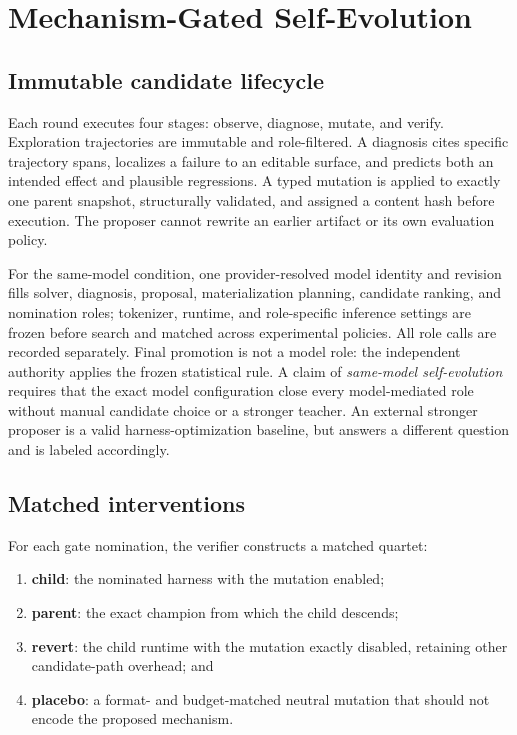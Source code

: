 \section{Mechanism-Gated Self-Evolution}
\label{sec:method}

\subsection{Immutable candidate lifecycle}

Each round executes four stages: observe, diagnose, mutate, and verify.
Exploration trajectories are immutable and role-filtered.  A diagnosis cites
specific trajectory spans, localizes a failure to an editable surface, and
predicts both an intended effect and plausible regressions.  A typed mutation
is applied to exactly one parent snapshot, structurally validated, and assigned
a content hash before execution.  The proposer cannot rewrite an earlier
artifact or its own evaluation policy.

For the same-model condition, one provider-resolved model identity and revision
fills solver, diagnosis, proposal, materialization planning, candidate ranking,
and nomination roles; tokenizer, runtime, and role-specific inference settings
are frozen before search and matched across experimental policies.  All role
calls are recorded separately.  Final promotion is not a model role: the
independent authority applies the frozen statistical rule.  A claim of
\emph{same-model self-evolution} requires that the exact model configuration
close every model-mediated role without manual candidate choice or a stronger
teacher.  An external stronger proposer is a valid harness-optimization
baseline, but answers a different question and is labeled accordingly.

\subsection{Matched interventions}

For each gate nomination, the verifier constructs a matched quartet:
\begin{enumerate}
  \item \textbf{child}: the nominated harness with the mutation enabled;
  \item \textbf{parent}: the exact champion from which the child descends;
  \item \textbf{revert}: the child runtime with the mutation exactly disabled,
  retaining other candidate-path overhead; and
  \item \textbf{placebo}: a format- and budget-matched neutral mutation that
  should not encode the proposed mechanism.
\end{enumerate}

